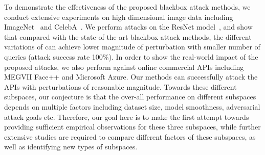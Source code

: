 To demonstrate the effectiveness of the proposed blackbox attack \name methods, 
we conduct extensive experiments on high dimensional image data including ImageNet~\cite{deng2009imagenet} and CelebA~\cite{liu2018large}. We perform attacks on the ResNet model~\cite{he2016deep}, and show that compared with the-state-of-the-art blackbox attack methods, the different variations of \name can achieve lower magnitude of perturbation with smaller number of queries (attack success rate 100\%). 
In order to show the real-world impact of the proposed attacks, we also perform \name against online commercial APIs including MEGVII Face++\cite{facepp-compare-api} and Microsoft Azure\cite{azure-detect-api}. Our methods can successfully attack the APIs with perturbations of reasonable magnitude.
Towards these different subspaces, our conjecture is that the over-all performance on different subspaces depends on multiple factors including dataset size, model smoothness, adversarial attack goals etc. Therefore, our goal here is to make the first attempt towards providing sufficient empirical observations for these three subspaces, while further extensive studies are required to compare different factors of these subspaces, as well as identifying new types of subspaces.




